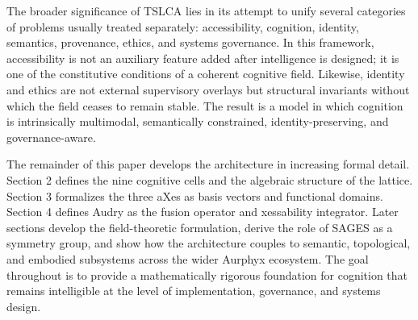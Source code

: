 The broader significance of TSLCA lies in its attempt to unify several categories of problems usually treated separately: accessibility, cognition, identity, semantics, provenance, ethics, and systems governance. In this framework, accessibility is not an auxiliary feature added after intelligence is designed; it is one of the constitutive conditions of a coherent cognitive field. Likewise, identity and ethics are not external supervisory overlays but structural invariants without which the field ceases to remain stable. The result is a model in which cognition is intrinsically multimodal, semantically constrained, identity-preserving, and governance-aware.

The remainder of this paper develops the architecture in increasing formal detail. Section 2 defines the nine cognitive cells and the algebraic structure of the lattice. Section 3 formalizes the three aXes as basis vectors and functional domains. Section 4 defines Audry as the fusion operator and xessability integrator. Later sections develop the field-theoretic formulation, derive the role of SAGES as a symmetry group, and show how the architecture couples to semantic, topological, and embodied subsystems across the wider Aurphyx ecosystem. The goal throughout is to provide a mathematically rigorous foundation for cognition that remains intelligible at the level of implementation, governance, and systems design.
